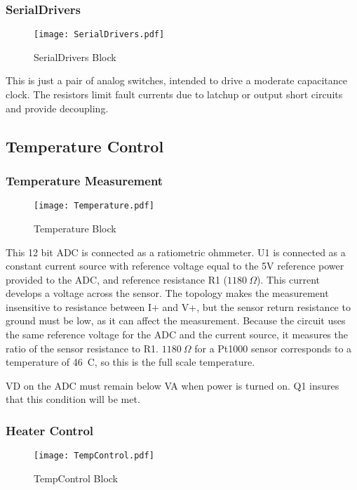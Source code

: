 \documentclass[a4paper,12pt]{article}
\begin{document}
\subsubsection{SerialDrivers}
   \begin{figure}
   \begin{center}
   \texttt{[image: SerialDrivers.pdf]}
   \end{center}
   \caption{SerialDrivers Block}
   \end{figure}
   
This is just a pair of analog switches, intended to drive a moderate capacitance clock. The resistors limit fault currents due to latchup or output short circuits and provide decoupling.

\subsection{Temperature Control}

\subsubsection{Temperature Measurement}
   \begin{figure}
   \begin{center}
   \texttt{[image: Temperature.pdf]}
   \end{center}
   \caption{Temperature Block}
   \end{figure}
   
This 12 bit ADC is connected as a ratiometric ohmmeter. U1 is connected as a constant current source with reference voltage equal to the 5V reference power provided to the ADC, and reference resistance R1 ($1180\ \Omega$). This current develops a voltage across the sensor. The topology makes the measurement insensitive to resistance between I+ and V+, but the sensor return resistance to ground must be low, as it can affect the measurement. Because the circuit uses the same reference voltage for the ADC and the current source, it measures the ratio of the sensor resistance to R1. $1180\ \Omega$ for a Pt1000 sensor corresponds to a temperature of 46\ C, so this is the full scale temperature.

VD on the ADC must remain below VA when power is turned on. Q1 insures that this condition will be met.

\subsubsection{Heater Control}
   \begin{figure}
   \begin{center}
   \texttt{[image: TempControl.pdf]}
   \end{center}
   \caption{TempControl Block}
   \end{figure}
\end{document}
